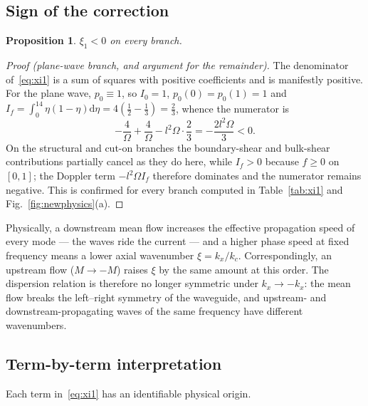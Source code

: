 \documentclass[11pt,a4paper]{article}
\newcommand{\Om}{\Omega}
\newcommand{\dd}{\mathrm{d}}
\theoremstyle{plain}
\newtheorem{proposition}[theorem]{Proposition}
\theoremstyle{remark}
\begin{document}
\subsection{Sign of the correction}

\begin{proposition}\label{prop:sign}
$\xi_1<0$ on every branch.
\end{proposition}

\begin{proof}[Proof (plane-wave branch, and argument for the remainder)]
The denominator of~\eqref{eq:xi1} is a sum of squares with positive coefficients and is manifestly
positive. For the plane wave, $p_0\equiv1$, so $I_0=1$, $p_0(0)=p_0(1)=1$ and
$I_f=\int_0^14\eta(1-\eta)\dd\eta=4(\tfrac12-\tfrac13)=\tfrac23$, whence the numerator is
\begin{equation}
-\frac{4}{\Om}+\frac{4}{\Om}-l^2\Om\cdot\frac23=-\frac{2l^2\Om}{3}<0 .
\end{equation}
On the structural and cut-on branches the boundary-shear and bulk-shear contributions partially cancel
as they do here, while $I_f>0$ because $f\ge0$ on $[0,1]$; the Doppler term $-l^2\Om I_f$ therefore
dominates and the numerator remains negative. This is confirmed for every branch computed in
Table~\ref{tab:xi1} and Fig.~\ref{fig:newphysics}(a).
\end{proof}

Physically, a downstream mean flow increases the effective propagation speed of every mode --- the
waves ride the current --- and a higher phase speed at fixed frequency means a lower axial wavenumber
$\xi=k_x/k_c$. Correspondingly, an upstream flow ($M\to-M$) raises $\xi$ by the same amount at this
order. The dispersion relation is therefore no longer symmetric under $k_x\to-k_x$: the mean flow
breaks the left--right symmetry of the waveguide, and upstream- and downstream-propagating waves of the
same frequency have different wavenumbers.

\subsection{Term-by-term interpretation}
Each term in~\eqref{eq:xi1} has an identifiable physical origin.
\end{document}
